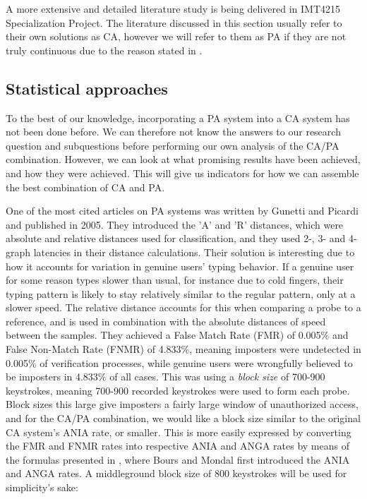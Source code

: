 \documentclass[informationsecurity]{gucmasterproject}
\begin{document}
A more extensive and detailed literature study \cite{nilsenSpec} is being delivered in IMT4215 Specialization Project.
The literature discussed in this section usually refer to their own solutions as CA, however we will refer to them as PA if they are not truly continuous due to the reason stated in .

\subsection{Statistical approaches}
To the best of our knowledge, incorporating a PA system into a CA system has not been done before. 
We can therefore not know the answers to our research question and subquestions before performing our own analysis of the CA/PA combination.
However, we can look at what promising results have been achieved, and how they were achieved.
This will give us indicators for how we can assemble the best combination of CA and PA.

One of the most cited articles on PA systems was written by Gunetti and Picardi \cite{gnp} and published in 2005.
They introduced the 'A' and 'R' distances, which were absolute and relative distances used for classification, and they used 2-, 3- and 4-graph latencies in their distance calculations.
Their solution is interesting due to how it accounts for variation in genuine users' typing behavior.
If a genuine user for some reason types slower than usual, for instance due to cold fingers, their typing pattern is likely to stay relatively similar to the regular pattern, only at a slower speed.
The relative distance accounts for this when comparing a probe to a reference, and is used in combination with the absolute distances of speed between the samples.
They achieved a False Match Rate (FMR) of 0.005\% and False Non-Match Rate (FNMR) of 4.833\%, meaning imposters were undetected in 0.005\% of verification processes, while genuine users were wrongfully believed to be imposters in 4.833\% of all cases. 
This was using a \textit{block size} of 700-900 keystrokes, meaning 700-900 recorded keystrokes were used to form each probe.
Block sizes this large give imposters a fairly large window of unauthorized access, and for the CA/PA combination, we would like a block size similar to the original CA system's ANIA rate, or smaller.
This is more easily expressed by converting the FMR and FNMR rates into respective ANIA and ANGA rates by means of the formulas presented in \cite{CA-performance}, where Bours and Mondal first introduced the ANIA and ANGA rates.
A middleground block size of 800 keystrokes will be used for simplicity's sake:
\end{document}
